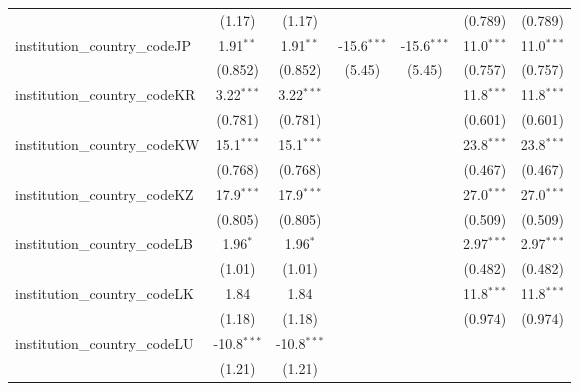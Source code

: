 \begin{tabular}{lcccccc}
                                         & (1.17)         & (1.17)         &               &               & (0.789)       & (0.789)\\   
   institution\_country\_codeJP          & 1.91$^{**}$    & 1.91$^{**}$    & -15.6$^{***}$ & -15.6$^{***}$ & 11.0$^{***}$  & 11.0$^{***}$\\   
                                         & (0.852)        & (0.852)        & (5.45)        & (5.45)        & (0.757)       & (0.757)\\   
   institution\_country\_codeKR          & 3.22$^{***}$   & 3.22$^{***}$   &               &               & 11.8$^{***}$  & 11.8$^{***}$\\   
                                         & (0.781)        & (0.781)        &               &               & (0.601)       & (0.601)\\   
   institution\_country\_codeKW          & 15.1$^{***}$   & 15.1$^{***}$   &               &               & 23.8$^{***}$  & 23.8$^{***}$\\   
                                         & (0.768)        & (0.768)        &               &               & (0.467)       & (0.467)\\   
   institution\_country\_codeKZ          & 17.9$^{***}$   & 17.9$^{***}$   &               &               & 27.0$^{***}$  & 27.0$^{***}$\\   
                                         & (0.805)        & (0.805)        &               &               & (0.509)       & (0.509)\\   
   institution\_country\_codeLB          & 1.96$^{*}$     & 1.96$^{*}$     &               &               & 2.97$^{***}$  & 2.97$^{***}$\\   
                                         & (1.01)         & (1.01)         &               &               & (0.482)       & (0.482)\\   
   institution\_country\_codeLK          & 1.84           & 1.84           &               &               & 11.8$^{***}$  & 11.8$^{***}$\\   
                                         & (1.18)         & (1.18)         &               &               & (0.974)       & (0.974)\\   
   institution\_country\_codeLU          & -10.8$^{***}$  & -10.8$^{***}$  &               &               &               &   \\   
                                         & (1.21)         & (1.21)         &               &               &               &   \\   

\end{tabular}
